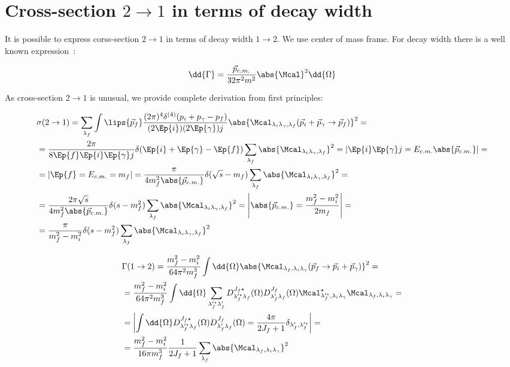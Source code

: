 \section{Cross-section $2 \rightarrow 1$ in terms of decay width} \label{sec:app:crsc-dw}

It is possible to express corss-section $2 \rightarrow 1$ in terms of decay width $1 \rightarrow 2$. We use center of mass frame. For decay width there is a well known expression~\cite{pdg}:

\begin{align}
    \dd{\Gamma} = \frac{\vec{p}_{c.m.}}{32 \pi^2 m^2} \abs{\Mcal}^2 \dd{\Omega}
\end{align}

As cross-section $2 \rightarrow 1$ is unusual, we provide complete derivation from first principles:

\begin{align}
        &\sigma(2 \rightarrow 1) = \sum_{\lambda_f} \int \lips{\vec{p}_f} \frac{(2\pi)^4 \delta^{(4)}(p_i + p_\gamma - p_f)}{(2 \Ep{i}) (2 \Ep{\gamma}) j} \abs{\Mcal_{\lambda_i \lambda_\gamma, \lambda_f}(\vec{p}_i + \vec{p}_\gamma \rightarrow \vec{p}_f)}^2 = \\
        &= \frac{2\pi}{8 \Ep{f} \Ep{i} \Ep{\gamma} j} \delta(\Ep{i} + \Ep{\gamma} - \Ep{f}) \sum_{\lambda_f} \abs{\Mcal_{\lambda_i \lambda_\gamma, \lambda_f}}^2 = \left| \Ep{i} \Ep{\gamma} j = E_{c.m.} \abs{\vec{p}_{c.m.}} \right| = \\
        &= \left| \Ep{f} = E_{c.m.} = m_f \right| = \frac{\pi}{4 m_f^2 \abs{\vec{p}_{c.m.}}} \delta(\sqrt{s} - m_f) \sum_{\lambda_f} \abs{\Mcal_{\lambda_i \lambda_\gamma, \lambda_f}}^2 = \\
        &= \frac{2 \pi \sqrt{s}}{4 m_f^2 \abs{\vec{p}_{c.m.}}} \delta(s - m_f^2) \sum_{\lambda_f} \abs{\Mcal_{\lambda_i \lambda_\gamma, \lambda_f}}^2 = \left| \abs{\vec{p}_{c.m.}} = \frac{m_f^2 - m_i^2}{2 m_f} \right| =\\
        &= \frac{\pi}{m_f^2 - m_i^2} \delta(s - m_f^2) \sum_{\lambda_f} \abs{\Mcal_{\lambda_i \lambda_\gamma, \lambda_f}}^2
\end{align}

\begin{align}
        &\Gamma(1 \rightarrow 2) =  \frac{m_f^2 - m_i^2}{64 \pi^2 m_f^3} \int \dd{\Omega} \abs{\Mcal_{\lambda_f, \lambda_i \lambda_\gamma}(\vec{p}_f \rightarrow \vec{p}_i + \vec{p}_\gamma)}^2 = \\
        &= \frac{m_f^2 - m_i^2}{64 \pi^2 m_f^3} \int \dd{\Omega} \sum_{\lambda_f^{\prime \star} \lambda_f^{\prime}} D^{J_f \star}_{\lambda^{\prime \star}_f \lambda_f}(\Omega) D^{J_f}_{\lambda^{\prime}_f \lambda_f}(\Omega) \Mcal^\star_{\lambda^{\prime \star}_f, \lambda_i \lambda_\gamma} \Mcal_{\lambda_f, \lambda_i \lambda_\gamma} = \\
        &= \left| \int \dd{\Omega}D^{J_f \star}_{\lambda^{\prime \star}_f \lambda_f}(\Omega) D^{J_f}_{\lambda^{\prime}_f \lambda_f}(\Omega) = \frac{4 \pi}{2J_f + 1} \delta_{\lambda_f^\prime, \lambda_f^{\prime \star}}  \right| = \\
        &= \frac{m_f^2 - m_i^2}{16 \pi m_f^3} \frac{1}{2J_f + 1} \sum_{\lambda_f} \abs{\Mcal_{\lambda_f, \lambda_i \lambda_\gamma}}^2
\end{align}

